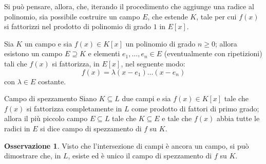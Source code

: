 \documentclass[11pt, a4paper]{scrartcl}
\theoremstyle{definition}
\numberwithin{esempio}{section}
\theoremstyle{definition}
\newtheorem{obs}{Osservazione}
\numberwithin{obs}{section}
\numberwithin{nota}{section}
\numberwithin{equation}{subsection}
\begin{document}
Si pu\`o pensare, allora, che, iterando il procedimento che aggiunge una radice al polinomio, sia possibile costruire un campo $E$, che estende $K$, tale per cui $f(x)$ si fattorizzi nel prodotto di polinomio di grado $1$ in $E[x]$.
\begin{teorema}
	{}{}
	Sia $K$ un campo e sia $f(x) \in K[x]$ un polinomio di grado $n\ge 0$; allora esistono un campo $E \supseteq K$ e elementi $e_1,\ldots,e_n \in E$ (eventualmente con ripetizioni) tali che $f(x)$ si fattorizza, in $E[x]$, nel seguente modo:
	\[
	f(x) = \lambda (x-e_1)\ldots(x-e_n)
	\] 
	con $\lambda \in E$ costante.
\end{teorema}
\begin{definizione}
	{Campo di spezzamento}{}
	Siano $K\subseteq L$ due campi e sia $f(x) \in K[x]$ tale che $f(x)$ si fattorizza completamente in $L$ come prodotto di fattori di primo grado; allora il pi\`u piccolo campo $E \subseteq L$ tale che $K \subseteq E$ e tale che $f(x)$ abbia tutte le radici in $E$ si dice campo di spezzamento di $f$ su $K$.
\end{definizione}
\begin{obs}
	Visto che l'intersezione di campi \`e ancora un campo, si pu\`o dimostrare che, in $L$, esiste ed \`e unico il campo di spezzamento di $f$ su $K$.
\end{obs}
\end{document}
